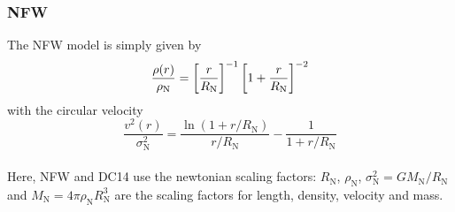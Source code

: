 \subsubsection*{NFW}
\noindent The NFW model is simply given by \citep{1996ApJ...462..563N} \begin{equation}
	\frac{\rho(r)}{\rho_\mathrm{N}} = \qbracket{\frac{r}{R_\mathrm{N}}}^{-1}\qbracket{1 + \frac{r}{R_\mathrm{N}}}^{-2}
\end{equation} with the circular velocity \begin{equation}
	\frac{v^2(r)}{\sigma_\mathrm{N}^2} = \frac{\ln(1 + r/R_\mathrm{N})}{r/R_\mathrm{N}} - \frac{1}{1 + r/R_\mathrm{N}}
\end{equation}\\

\noindent Here, NFW and DC14 use the newtonian scaling factors: $R_\mathrm{N}$, $\rho_\mathrm{N}$, $\sigma_\mathrm{N}^2 = G M_\mathrm{N}/R_\mathrm{N}$ and $M_\mathrm{N} = 4\pi \rho_\mathrm{N} R_\mathrm{N}^3$ are the scaling factors for length, density, velocity and mass.